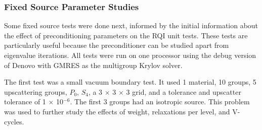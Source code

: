 \subsubsection{Fixed Source Parameter Studies}
Some fixed source tests were done next, informed by the initial information about the effect of preconditioning parameters on the RQI unit tests. These tests are particularly useful because the preconditioner can be studied apart from eigenvalue iterations. All tests were run on one processor using the debug version of Denovo with GMRES as the multigroup Krylov solver.

The first test was a small vacuum boundary test. It used 1 material, 10 groups, 5 upscattering groups, $P_{0}$, $S_{4}$, a 3 $\times$ 3 $\times$ 3 grid, and a tolerance and upscatter tolerance of 1 $\times$ 10$^{-6}$. The first 3 groups had an isotropic source. This problem was used to further study the effects of weight, relaxations per level, and V-cycles.

